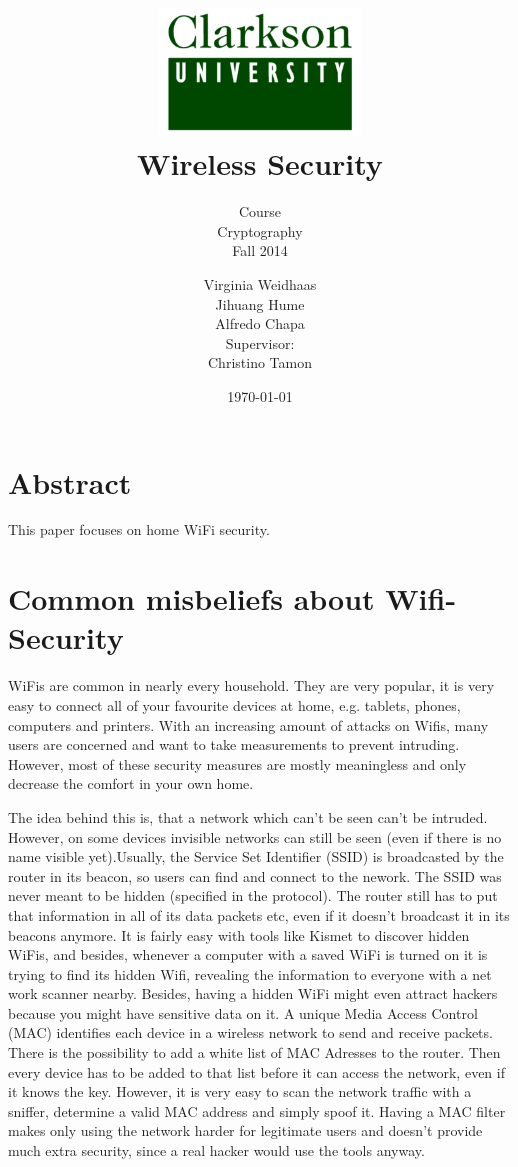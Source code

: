 \documentclass[a4paper,12pt,pagesize,headsepline,bibtotoc,titlepage]{scrartcl}
\title{
	\includegraphics*[width=0.4\textwidth]{clarkson.png}\\
	\vspace{24pt}
	Wireless Security
}
\subtitle{
	Course\\
	Cryptography\\
	Fall 2014
}
\author{
	Virginia Weidhaas\\[12pt]
    Jihuang Hume\\[12pt]
	Alfredo Chapa\\[12pt]	
	Supervisor:\\
	Christino Tamon
}
\date{\today}
\begin{document}
\maketitle
\tableofcontents
\newpage
\section{Abstract}
This paper focuses on home WiFi security.
\newpage


\section{Common misbeliefs about Wifi-Security}

WiFis are common in nearly every household. They are very popular, it is very easy to connect all of your favourite devices at home, e.g. tablets, phones, computers and printers.
With an increasing amount of attacks on Wifis, many users are concerned and want to take measurements to prevent intruding.
However, most of these security measures are mostly meaningless and only decrease the comfort in your own home.

The idea behind this is, that a network which can't be seen can't be intruded.
However, on  some devices invisible networks can still be seen (even if there is no name visible yet).Usually, the Service Set Identifier (SSID) is broadcasted by the router in its beacon, so users can find and connect to the nework.
The SSID was never meant to be hidden (specified in the protocol).
The router still has to put that information in all of its data packets etc, even if it doesn't broadcast it in its beacons anymore.
It is fairly easy with tools like Kismet to discover hidden WiFis, and besides, whenever a computer with a saved WiFi is turned on it is trying to find its hidden Wifi, revealing the information to everyone with a net work scanner nearby. 
Besides, having a hidden WiFi might even attract hackers because you might have sensitive data on it.
A unique Media Access Control (MAC) identifies each device in a wireless network to send and receive packets.
There is the possibility to add a white list of MAC Adresses to the router. Then every device has to be added to that list before it can access the network, even if it knows the key.
However, it is very easy to scan the network traffic with a sniffer, determine a valid MAC address and simply spoof it.
Having a MAC filter makes only using the network harder for legitimate users and doesn't provide much extra security, since a real hacker would use the tools anyway.
\end{document}
